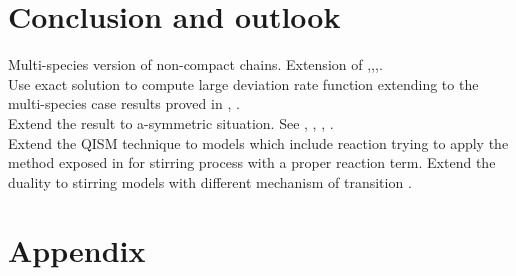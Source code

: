 \documentclass[10pt]{article}
\numberwithin{equation}{section}
\numberwithin{equation}{subsection}
\newcommand{\oa}{\mathbf{a}}
\newcommand{\oad}{\mathbf{a}^{\dagger}}
\begin{document}
\section{Conclusion and outlook}
Multi-species version of non-compact chains. Extension of \cite{frassek2022exact},\cite{frassek2022integrable},\cite{frassek2020non},\cite{frassek2021duality}. \\
Use exact solution to compute large deviation rate function extending to the multi-species case results proved in \cite{derrida1998exact}, \cite{mallick2022exact}. \\
Extend the result to a-symmetric situation. See \cite{belitsky2018self}, \cite{belitsky2015quantum}, \cite{crampe2016integrable}, \cite{finn2018matrix}. \\
Extend the QISM technique to models which include reaction trying to apply the method exposed in \cite{de2021yang} for stirring process with a proper reaction term. Extend the duality to stirring models with different mechanism of transition \cite{chatterjee2023multi}. 







\appendix
\section*{Appendix}
\begin{comment}
{\color{blue}
\section{Oscillator realization}\label{appA}

 The basis element $ (E_{ab})_{a,b\in\{1,\ldots,N\}}$ of $gl(N)$ can also be thought as proper compositions of the rising, and lowering operators of th Heisenberg Lie algebra
  \begin{equation}\label{creationOperators}
	\begin{cases}
	\oad_{a}|n_{1},\ldots,n_{a},\ldots,n_{N}\rangle = |n_{1},\ldots,n_{a}+1,\ldots,n_{N}\rangle\\
	\oa_{a}|n_{1},\ldots,n_{a},\ldots,n_{N}\rangle =n_{a}|n_{1},\ldots,n_{a}-1,\ldots,n_{N}\rangle
	\end{cases}
\end{equation}
with commutaion relations
\begin{equation}
	[\oad_{a},\oa_{b}]=-\mathbbm{1}\,\delta_{ab}
\end{equation}
Therefore, we have that 
\begin{equation}
		E_{ab}=\oad_{a}\oa_{b}\qquad \forall a,b=1,\ldots N
\end{equation} 
fulfil the action on the basis vector \eqref{actionE} and the commutation relation \eqref{eq:comgl} }
\end{comment}
\end{document}
